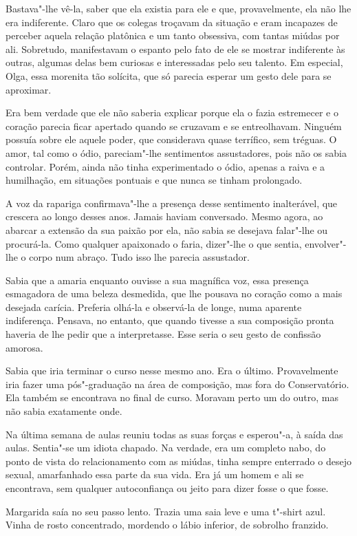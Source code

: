 Bastava"-lhe vê-la, saber que ela existia para ele e que, provavelmente,
ela não lhe era indiferente. Claro que os colegas troçavam da situação e
eram incapazes de perceber aquela relação platônica e um tanto
obsessiva, com tantas miúdas por ali. Sobretudo, manifestavam o espanto
pelo fato de ele se mostrar indiferente às outras, algumas delas bem
curiosas e interessadas pelo seu talento. Em especial, Olga, essa
morenita tão solícita, que só parecia esperar um gesto dele para se
aproximar.

Era bem verdade que ele não saberia explicar porque ela o fazia
estremecer e o coração parecia ficar apertado quando se cruzavam e se
entreolhavam. Ninguém possuía sobre ele aquele poder, que considerava
quase terrífico, sem tréguas. O amor, tal como o ódio, pareciam"-lhe
sentimentos assustadores, pois não os sabia controlar. Porém, ainda não
tinha experimentado o ódio, apenas a raiva e a humilhação, em situações
pontuais e que nunca se tinham prolongado.

A voz da rapariga confirmava"-lhe a presença desse sentimento
inalterável, que crescera ao longo desses anos. Jamais haviam
conversado. Mesmo agora, ao abarcar a extensão da sua paixão por ela,
não sabia se desejava falar"-lhe ou procurá-la. Como qualquer apaixonado
o faria, dizer"-lhe o que sentia, envolver"-lhe o corpo num abraço. Tudo
isso lhe parecia assustador.

Sabia que a amaria enquanto ouvisse a sua magnífica voz, essa presença
esmagadora de uma beleza desmedida, que lhe pousava no coração como a
mais desejada carícia. Preferia olhá-la e observá-la de longe, numa
aparente indiferença. Pensava, no entanto, que quando tivesse a sua
composição pronta haveria de lhe pedir que a interpretasse. Esse seria o
seu gesto de confissão amorosa.

Sabia que iria terminar o curso nesse mesmo ano. Era o último.
Provavelmente iria fazer uma pós"-graduação na área de composição, mas
fora do Conservatório. Ela também se encontrava no final de curso.
Moravam perto um do outro, mas não sabia exatamente onde.

Na última semana de aulas reuniu todas as suas forças e esperou"-a, à
saída das aulas. Sentia"-se um idiota chapado. Na verdade, era um
completo nabo, do ponto de vista do relacionamento com as miúdas, tinha
sempre enterrado o desejo sexual, amarfanhado essa parte da sua vida.
Era já um homem e ali se encontrava, sem qualquer autoconfiança ou
jeito para dizer fosse o que fosse.

Margarida saía no seu passo lento. Trazia uma saia leve e uma t"-shirt
azul. Vinha de rosto concentrado, mordendo o lábio inferior, de sobrolho
franzido.

